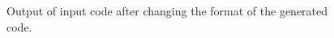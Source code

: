\begin{figure}[!h]
{\indent
{\mySmallFontSize

\begin{latexonly}
   
\end{latexonly}

\begin{htmlonly}
   
\end{htmlonly}

}
}
\caption{Output of input code after changing the format of the generated code.}
\label{Tutorial:exampleOutput_codeGenerationFormatControl}
\end{figure}



























